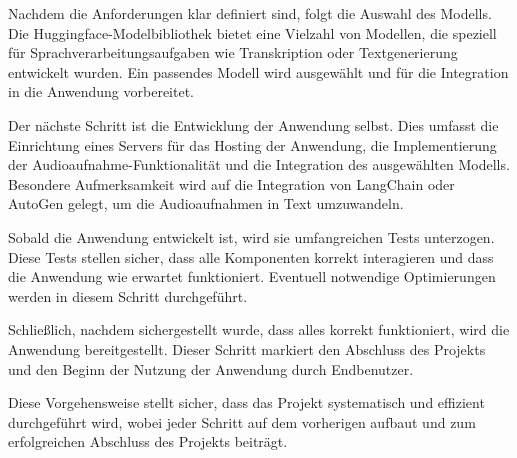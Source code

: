 \documentclass[12pt,a4paper,parskip=full]{scrartcl}
\begin{document}
Nachdem die Anforderungen klar definiert sind, folgt die Auswahl des Modells.
Die Huggingface-Modelbibliothek bietet eine Vielzahl von Modellen, die speziell für Sprachverarbeitungsaufgaben wie Transkription oder Textgenerierung entwickelt wurden. \cite{huggingface_hugging_nodate}
Ein passendes Modell wird ausgewählt und für die Integration in die Anwendung vorbereitet.

Der nächste Schritt ist die Entwicklung der Anwendung selbst. Dies umfasst die Einrichtung eines Servers für das Hosting der Anwendung, die Implementierung der Audioaufnahme-Funktionalität und die Integration des ausgewählten Modells. Besondere Aufmerksamkeit wird auf die Integration von LangChain \cite{langchain_agents_nodate} oder AutoGen \cite{microsoft_getting_nodate} gelegt, um die Audioaufnahmen in Text umzuwandeln.

Sobald die Anwendung entwickelt ist, wird sie umfangreichen Tests unterzogen.
Diese Tests stellen sicher, dass alle Komponenten korrekt interagieren und dass die Anwendung wie erwartet funktioniert. Eventuell notwendige Optimierungen werden in diesem Schritt durchgeführt.

Schließlich, nachdem sichergestellt wurde, dass alles korrekt funktioniert, wird die Anwendung bereitgestellt.
Dieser Schritt markiert den Abschluss des Projekts und den Beginn der Nutzung der Anwendung durch Endbenutzer.

Diese Vorgehensweise stellt sicher, dass das Projekt systematisch und effizient durchgeführt wird, wobei jeder Schritt auf dem vorherigen aufbaut und zum erfolgreichen Abschluss des Projekts beiträgt.



\printbibliography
\end{document}
